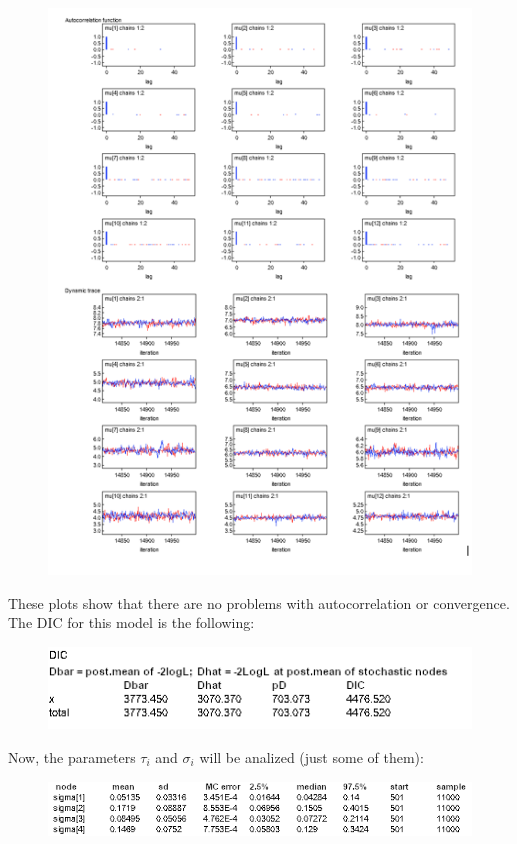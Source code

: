 \documentclass{article}
\begin{document}
\begin{figure}[ht!]
\centering
\includegraphics[width=14cm]{figures/model3_mu.png}
\end{figure}

\newpage
These plots show that there are no problems with autocorrelation or convergence. The DIC for this model is the following:

\begin{figure}[ht!]
\centering
\includegraphics[width=12cm]{figures/model3_DIC.png}
\end{figure}
\newpage
Now, the parameters $\tau_i$ and $\sigma_i$ will be analized (just some of them):

\begin{figure}[ht!]
\centering
\includegraphics[width=12cm]{figures/model3_ultima.png}
\end{figure}
\end{document}
